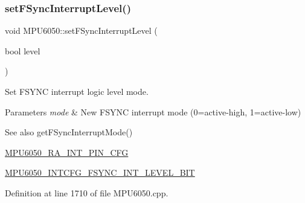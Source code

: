\begin{DoxyCode}{0}

\end{DoxyCode}
\mbox{\label{classMPU6050_a2b1c75cfc29e8ff8205f4ff33a426716}} 
\subsubsection{\texorpdfstring{setFSyncInterruptLevel()}{setFSyncInterruptLevel()}}
{\footnotesize\ttfamily void M\+P\+U6050\+::set\+F\+Sync\+Interrupt\+Level (\begin{DoxyParamCaption}\item[{bool}]{level }\end{DoxyParamCaption})}

Set F\+S\+Y\+NC interrupt logic level mode. 
\begin{DoxyParams}{Parameters}
{\em mode} & New F\+S\+Y\+NC interrupt mode (0=active-\/high, 1=active-\/low) \\
\hline
\end{DoxyParams}
\begin{DoxySeeAlso}{See also}
get\+F\+Sync\+Interrupt\+Mode() 

\mbox{\hyperlink{MPU6050_8h_a82344e1daef2bac2e0d938319528be6c}{M\+P\+U6050\+\_\+\+R\+A\+\_\+\+I\+N\+T\+\_\+\+P\+I\+N\+\_\+\+C\+FG}} 

\mbox{\hyperlink{MPU6050_8h_a1696357738f5b7e4bc50ec4170be3324}{M\+P\+U6050\+\_\+\+I\+N\+T\+C\+F\+G\+\_\+\+F\+S\+Y\+N\+C\+\_\+\+I\+N\+T\+\_\+\+L\+E\+V\+E\+L\+\_\+\+B\+IT}} 
\end{DoxySeeAlso}


Definition at line 1710 of file M\+P\+U6050.\+cpp.


